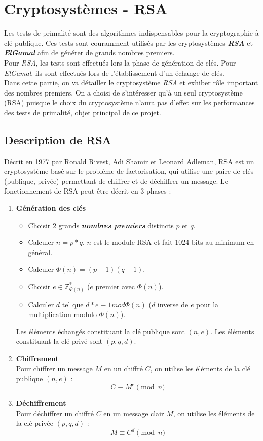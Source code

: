 \section{Cryptosystèmes - RSA}

	Les tests de primalité sont des algorithmes indispensables pour la cryptographie à clé publique. Ces tests sont couramment utilisés par les cryptosystèmes \textbf{\textit{RSA}} et \textbf{\textit{ElGamal}} afin de générer de grands nombres premiers.\\
	\indent Pour \textit{RSA}, les tests sont effectués lors la phase de génération de clés. Pour \textit{ElGamal}, ils sont effectués lors de l'établissement d'un échange de clés.\\
	\indent Dans cette partie, on va détailler le cryptosystème \textit{RSA} et exhiber rôle important des nombres premiers. On a choisi de s'intéresser qu'à un seul cryptosystème (RSA) puisque le choix du cryptosystème n'aura pas d'effet sur les performances des tests de primalité, objet principal de ce projet.
	
	\subsection{Description de RSA}
	Décrit en 1977 par Ronald Rivest, Adi Shamir et Leonard Adleman, RSA est un cryptosystème basé sur le problème de factorisation, qui utilise une paire de clés (publique, privée) permettant de chiffrer et de déchiffrer un message. Le fonctionnement de RSA peut être décrit en 3 phases :
		\begin{enumerate}[leftmargin=2em]
			\vspace{1em}
			\item \textbf{Génération des clés} 
			\begin{itemize}
				\item Choisir 2 grands \textbf{\textit{nombres premiers}} distincts $p$ et $q$.
				\item Calculer $n = p * q$. $n$ est le module RSA et fait 1024 bits au minimum en général.
				\item Calculer $\Phi(n) = (p - 1)(q - 1)$.
				\item Choisir $e \in \mathbb{Z}_{\Phi(n)}^{*}$ ($e$ premier avec $\Phi(n)$).
				\item Calculer $d$ tel que $d*e \equiv 1 mod \Phi(n)$ ($d$ inverse de $e$ pour la multiplication modulo $\Phi(n)$).
			\end{itemize}
			Les éléments échangés constituant la clé publique sont $(n, e)$. Les éléments constituant la clé privé sont $(p, q, d)$.
			\vspace{1em}
			\item \textbf{Chiffrement}\\
			Pour chiffrer un message $M$ en un chiffré $C$, on utilise les éléments de la clé publique $(n, e)$ :
			\[C \equiv M^{e} \pmod n\]		
			
			\item \textbf{Déchiffrement}\\
			Pour déchiffrer un chiffré $C$ en un message clair $M$, on utilise les éléments de la clé privée $(p, q, d)$ :
			\[M \equiv C^{d} \pmod n\]
		\end{enumerate}
		
